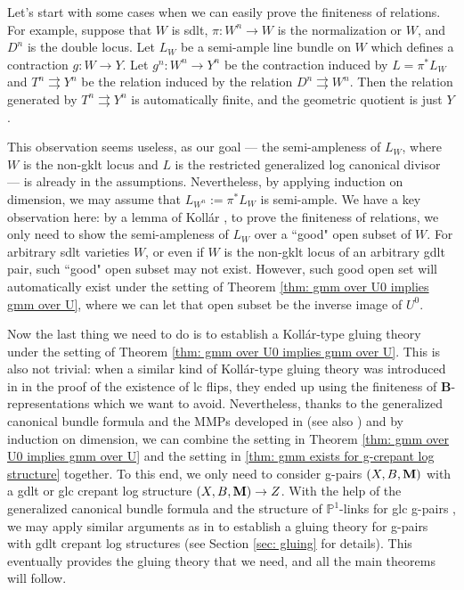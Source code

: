 \documentclass[11pt]{amsart}
\numberwithin{equation}{section}
\newcommand{\Mm}{{\bf{M}}}
\theoremstyle{definition}
\theoremstyle{definition}
\theoremstyle{definition}
\begin{document}
\smallskip

Let's start with some cases when we can easily prove the finiteness of relations. For example, suppose that $W$ is sdlt, $\pi: W^n\to W$ is the normalization or $W$, and $D^n$ is the double locus. Let $L_W$ be a semi-ample line bundle on $W$ which defines a contraction $g: W\to Y$. Let $g^n: W^n\to Y^n$ be the contraction induced by $L=\pi^*L_W$ and $T^n\rightrightarrows Y^n$ be the relation induced by the relation $D^n\rightrightarrows W^n$. Then the relation generated by $T^n\rightrightarrows Y^n$ is automatically finite, and the geometric quotient is just $Y$. 

This observation seems useless, as our goal --- the semi-ampleness of $L_W$, where $W$ is the non-gklt locus and $L$ is the restricted generalized log canonical divisor --- is already in the assumptions. Nevertheless, by applying induction on dimension, we may assume that $L_{W^n}:=\pi^*L_W$ is semi-ample. We have a key observation here: by a lemma of Koll\'ar  \cite[Lemma 9.55]{Kol13}, to prove the finiteness of relations, we only need to show the semi-ampleness of $L_W$ over a ``good" open subset of $W$. For arbitrary sdlt varieties $W$, or even if $W$ is the non-gklt locus of an arbitrary gdlt pair, such ``good" open subset may not exist. However, such good open set will automatically exist under the setting of Theorem \ref{thm: gmm over U0 implies gmm over U}, where we can let that open subset be the inverse image of $U^0$. 

Now the last thing we need to do is to establish a Koll\'ar-type gluing theory under the setting of Theorem \ref{thm: gmm over U0 implies gmm over U}. This is also not trivial: when a similar kind of Koll\'ar-type gluing theory was introduced in \cite{HX13,HX16} in the proof of the existence of lc flips, they ended up using the finiteness of \textbf{B}-representations which we want to avoid. Nevertheless, thanks to the generalized canonical bundle formula and the MMPs developed in \cite{LX22} (see also \cite{HL21a,Has22}) and by induction on dimension, we can combine the setting in Theorem \ref{thm: gmm over U0 implies gmm over U} and the setting in \ref{thm: gmm exists for g-crepant log structure} together. To this end, we only need to consider g-pairs $(X,B,\Mm)$ with a gdlt or glc crepant log structure $(X,B,\Mm)\rightarrow Z$. With the help of the generalized canonical bundle formula \cite{Fil20,FS20,HL21b,JLX22} and the structure of $\mathbb P^1$-links for glc g-pairs \cite{FS20}, we may apply similar arguments as in \cite[Chapter 4]{Kol13} to establish a gluing theory for g-pairs with gdlt crepant log structures (see Section \ref{sec: gluing} for details). This eventually provides the gluing theory that we need, and all the main theorems will follow.
\end{document}
